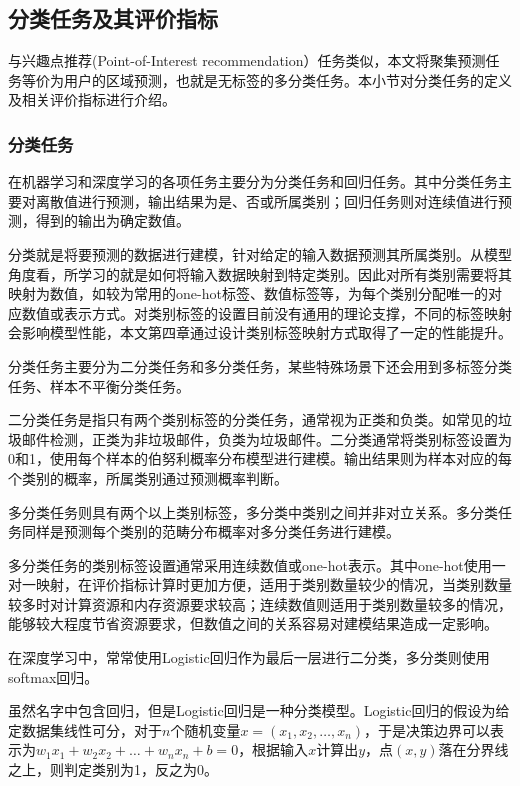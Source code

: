 \documentclass[master]{thesis-uestc}
\begin{document}
\subsection{分类任务及其评价指标}
与兴趣点推荐(Point-of-Interest recommendation）任务类似，本文将聚集预测任务等价为用户的区域预测，也就是无标签的多分类任务。本小节对分类任务的定义及相关评价指标进行介绍。

\subsubsection{分类任务}
在机器学习和深度学习的各项任务主要分为分类任务和回归任务。其中分类任务主要对离散值进行预测，输出结果为是、否或所属类别；回归任务则对连续值进行预测，得到的输出为确定数值。

分类就是将要预测的数据进行建模，针对给定的输入数据预测其所属类别。从模型角度看，所学习的就是如何将输入数据映射到特定类别。因此对所有类别需要将其映射为数值，如较为常用的one-hot标签、数值标签等，为每个类别分配唯一的对应数值或表示方式。对类别标签的设置目前没有通用的理论支撑，不同的标签映射会影响模型性能，本文第四章通过设计类别标签映射方式取得了一定的性能提升。

分类任务主要分为二分类任务和多分类任务，某些特殊场景下还会用到多标签分类任务、样本不平衡分类任务。

二分类任务是指只有两个类别标签的分类任务，通常视为正类和负类。如常见的垃圾邮件检测，正类为非垃圾邮件，负类为垃圾邮件。二分类通常将类别标签设置为0和1，使用每个样本的伯努利概率分布模型进行建模。输出结果则为样本对应的每个类别的概率，所属类别通过预测概率判断。

多分类任务则具有两个以上类别标签，多分类中类别之间并非对立关系。多分类任务同样是预测每个类别的范畴分布概率对多分类任务进行建模。

多分类任务的类别标签设置通常采用连续数值或one-hot表示。其中one-hot使用一对一映射，在评价指标计算时更加方便，适用于类别数量较少的情况，当类别数量较多时对计算资源和内存资源要求较高；连续数值则适用于类别数量较多的情况，能够较大程度节省资源要求，但数值之间的关系容易对建模结果造成一定影响。

在深度学习中，常常使用Logistic回归作为最后一层进行二分类，多分类则使用softmax回归。

虽然名字中包含回归，但是Logistic回归是一种分类模型。Logistic回归的假设为给定数据集线性可分，对于$n$个随机变量$x=(x_1,x_2,\dots,x_n)$，于是决策边界可以表示为$w_1x_1+w_2x_2+\dots+w_nx_n+b=0$，根据输入$x$计算出$y$，点$(x,y)$落在分界线之上，则判定类别为1，反之为0。
\end{document}
